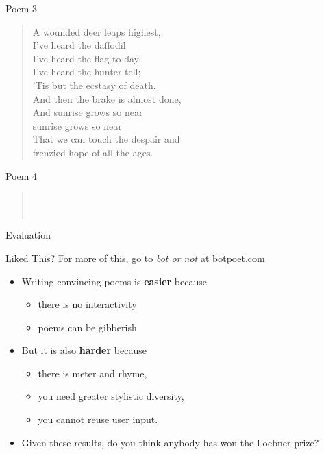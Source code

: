 \documentclass[xcolor={usenames,svgnames,x11names,dvipsnames,table}]{beamer}
\begin{document}
\begin{frame}{Poem 3}
    \small
    \begin{quote}
        A wounded deer leaps highest,\\
        I've heard the daffodil\\
        I've heard the flag to-day\\
        I've heard the hunter tell;\\
        'Tis but the ecstasy of death,\\
        And then the brake is almost done,\\
        And sunrise grows so near\\
        sunrise grows so near\\
        That we can touch the despair and\\
        frenzied hope of all the ages.\\
    \end{quote}
\end{frame}

\begin{frame}{Poem 4}
    \small
    \begin{quote}
        \\
        \\
    \end{quote}
\end{frame}

\begin{frame}{Evaluation}
    \begin{block}{Liked This?}
        For more of this, go to \href{botpoem.com}{\emph{bot or not}} at \url{botpoet.com}
    \end{block}

    \pause
    \begin{itemize}
        \item Writing convincing poems is \textbf{easier} because
            \begin{itemize}
                \item there is no interactivity
                \item poems can be gibberish
            \end{itemize}
        \item But it is also \textbf{harder} because
            \begin{itemize}
                \item there is meter and rhyme,
                \item you need greater stylistic diversity,
                \item you cannot reuse user input.
            \end{itemize}
        \item Given these results, do you think anybody has won the Loebner prize? 
    \end{itemize}
\end{frame}
\end{document}
